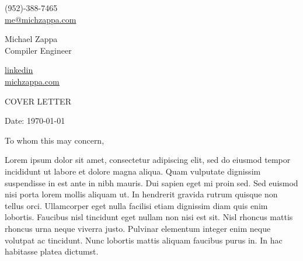\documentclass[11pt,a4]{article}
\begin{document}
\begin{center}
    \begin{minipage}[b]{0.24\textwidth}
            \large (952)-388-7465 \\
            \large \href{mailto:me@michzappa.com}{me@michzappa.com} 
    \end{minipage}%
    \begin{minipage}[b]{0.5\textwidth}
            \centering
            {\Huge Michael Zappa} \\ %
            \vspace{0.1cm}
            {\color{UI_blue} \Large{Compiler Engineer}} \\
    \end{minipage}%
    \begin{minipage}[b]{0.24\textwidth}
            \flushright \large
            {\href{https://www.linkedin.com/in/michael-zappa/}{\underline{linkedin}} } \\
            \href{https://michzappa.com}{\underline{michzappa.com}}
    \end{minipage}   
    
\vspace{-0.15cm} 
{\color{UI_blue} \hrulefill}
\end{center}

\justify
\setlength{\parindent}{0pt}
\setlength{\parskip}{12pt}
\vspace{0.2cm}
\begin{center}
    {\color{UI_blue} \Large{COVER LETTER}}
\end{center}



Date: \today \par \vspace{-0.1cm}
To whom this may concern, 

Lorem ipsum dolor sit amet, consectetur adipiscing elit, sed do eiusmod tempor incididunt ut labore et dolore magna aliqua. Quam vulputate dignissim suspendisse in est ante in nibh mauris. Dui sapien eget mi proin sed. Sed euismod nisi porta lorem mollis aliquam ut. In hendrerit gravida rutrum quisque non tellus orci. Ullamcorper eget nulla facilisi etiam dignissim diam quis enim lobortis. Faucibus nisl tincidunt eget nullam non nisi est sit. Nisl rhoncus mattis rhoncus urna neque viverra justo. Pulvinar elementum integer enim neque volutpat ac tincidunt. Nunc lobortis mattis aliquam faucibus purus in. In hac habitasse platea dictumst. \par
\end{document}
